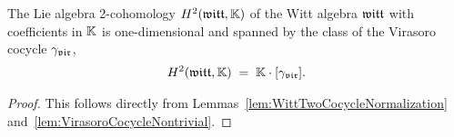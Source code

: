 \begin{lemma}
  \label{lem:WittTwoCohomologyIsOneDimensional}
  \leanok
  The Lie algebra 2-cohomology $H^2(\mathfrak{witt},\mathbb{K})$ of the Witt
  algebra $\mathfrak{witt}$ with coefficients in $\mathbb{K}$ is one-dimensional
  and spanned by the class of the Virasoro cocycle ${\gamma}_{\mathfrak{vir}}$,
  \begin{align*}
    H^2(\mathfrak{witt},\mathbb{K}) \; = \; \mathbb{K} \cdot [{\gamma}_{\mathfrak{vir}}] .
  \end{align*}
\end{lemma}
\begin{proof}
  \leanok
  This follows directly from
  Lemmas~\ref{lem:WittTwoCocycleNormalization}
  and~\ref{lem:VirasoroCocycleNontrivial}.
\end{proof}

